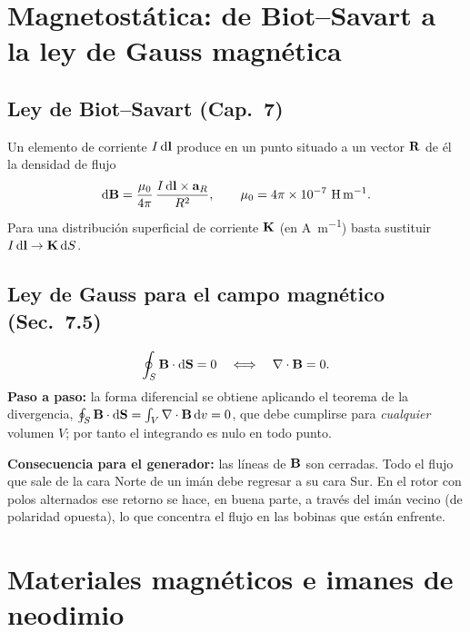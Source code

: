 \documentclass[11pt]{article}
\begin{document}
\section{Magnetostática: de Biot--Savart a la ley de Gauss magnética}

\subsection{Ley de Biot--Savart (Cap.~7)}
Un elemento de corriente $I\,\mathrm{d}\mathbf{l}$ produce en un punto situado a un vector $\mathbf{R}$ de él la densidad
de flujo
\begin{equation}
  \dif\vect{B} = \frac{\mu_0}{4\pi}\,\frac{I\,\dif\vect{l}\times\unitario{R}}{R^2},
  \qquad \mu_0 = 4\pi\times10^{-7}\ \si{\henry\per\meter}.
  \label{eq:biot}
\end{equation}
Para una distribución superficial de corriente $\mathbf{K}$ (en \si{\ampere\per\meter}) basta sustituir
$I\,\mathrm{d}\mathbf{l}\to\mathbf{K}\,\mathrm{d} S$.

\subsection{Ley de Gauss para el campo magnético (Sec.~7.5)}
\begin{equation}
  \oint_S \mathbf{B}\cdot\mathrm{d}\mathbf{S} = 0 \quad\Longleftrightarrow\quad \nabla\cdot\mathbf{B}=0 .
\end{equation}
\textbf{Paso a paso:} la forma diferencial se obtiene aplicando el teorema de la divergencia,
$\oint_S\mathbf{B}\cdot\mathrm{d}\mathbf{S}=\int_V\nabla\cdot\mathbf{B}\,\mathrm{d} v=0$, que debe cumplirse para \emph{cualquier}
volumen $V$; por tanto el integrando es nulo en todo punto.

\textbf{Consecuencia para el generador:} las líneas de $\mathbf{B}$ son cerradas. Todo el flujo que sale de la
cara Norte de un imán debe regresar a su cara Sur. En el rotor con polos alternados ese retorno se hace, en
buena parte, a través del imán vecino (de polaridad opuesta), lo que concentra el flujo en las bobinas que
están enfrente.

\section{Materiales magnéticos e imanes de neodimio}
\end{document}
